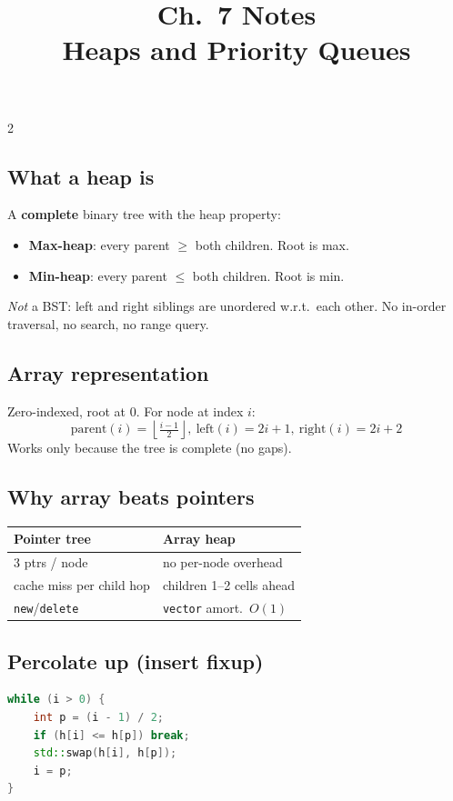 \documentclass[10pt]{article}
\title{Ch.~7 Notes\\\large Heaps and Priority Queues}
\author{}
\date{}
\begin{document}
\maketitle
\vspace{-2em}

\begin{multicols}{2}

\subsection*{What a heap is}
A \textbf{complete} binary tree with the heap property:
\begin{itemize}
    \item \textbf{Max-heap}: every parent $\ge$ both children. Root is max.
    \item \textbf{Min-heap}: every parent $\le$ both children. Root is min.
\end{itemize}
\textit{Not} a BST: left and right siblings are unordered w.r.t.\
each other. No in-order traversal, no search, no range query.

\subsection*{Array representation}
Zero-indexed, root at 0. For node at index $i$:
\[
\text{parent}(i) = \left\lfloor \tfrac{i-1}{2} \right\rfloor,\
\text{left}(i) = 2i+1,\
\text{right}(i) = 2i+2
\]
Works only because the tree is complete (no gaps).

\subsection*{Why array beats pointers}
\begin{tabular}{@{}l|l@{}}
\textbf{Pointer tree}       & \textbf{Array heap}\\
\hline
3 ptrs / node               & no per-node overhead\\
cache miss per child hop    & children 1--2 cells ahead\\
\texttt{new}/\texttt{delete}& \texttt{vector} amort.\ $O(1)$
\end{tabular}

\subsection*{Percolate up (insert fixup)}
\begin{lstlisting}[language=C++]
while (i > 0) {
    int p = (i - 1) / 2;
    if (h[i] <= h[p]) break;
    std::swap(h[i], h[p]);
    i = p;
}
\end{lstlisting}


\end{multicols}
\end{document}
